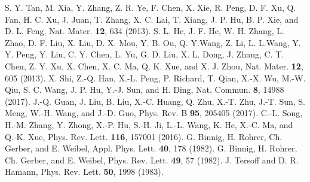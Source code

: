 \documentclass[twocolumn,aps,showpacs,prb]{revtex4-1}
\begin{document}
\begin{thebibliography}{}
 S. Y. Tan, M. Xia, Y. Zhang, Z. R. Ye, F. Chen, X. Xie, R. Peng, D. F. Xu, Q. Fan, H. C. Xu, J. Juan, T. Zhang, X. C. Lai, T. Xiang, J. P. Hu, B. P. Xie, and D. L. Feng, Nat. Mater. {\bf 12}, 634 (2013).
 S. L. He, J. F. He, W. H. Zhang, L. Zhao, D. F. Liu, X. Liu, D. X. Mou, Y. B. Ou, Q. Y.Wang, Z. Li, L. L.Wang, Y. Y. Peng, Y. Liu, C. Y. Chen, L. Yu, G. D. Liu, X. L. Dong, J. Zhang, C. T. Chen, Z. Y. Xu, X. Chen, X. C. Ma, Q. K. Xue, and X. J. Zhou, Nat. Mater. {\bf 12}, 605 (2013).
 X. Shi, Z.-Q. Han, X.-L. Peng, P. Richard, T. Qian, X.-X. Wu, M.-W. Qiu, S. C. Wang, J. P. Hu, Y.-J. Sun, and H. Ding, Nat. Commun. {\bf 8}, 14988 (2017).
 J.-Q. Guan, J. Liu, B. Liu, X.-C. Huang, Q. Zhu, X.-T. Zhu, J.-T. Sun, S. Meng, W.-H. Wang, and J.-D. Guo, Phys. Rev. B {\bf 95}, 205405 (2017).
 C.-L. Song, H.-M. Zhang, Y. Zhong, X.-P. Hu, S.-H. Ji, L.-L. Wang, K. He, X.-C. Ma, and Q.-K. Xue, Phys. Rev. Lett. {\bf 116},  157001 (2016).
 G. Binnig, H. Rohrer, Ch. Gerber, and E. Weibel, Appl. Phys. Lett. {\bf 40}, 178 (1982).
 G. Binnig, H. Rohrer, Ch. Gerber, and E. Weibel, Phys. Rev. Lett. {\bf 49}, 57 (1982).
 J. Tersoff and D. R. Hamann, Phys. Rev. Lett. {\bf 50}, 1998 (1983).


\end{thebibliography}
\end{document}
